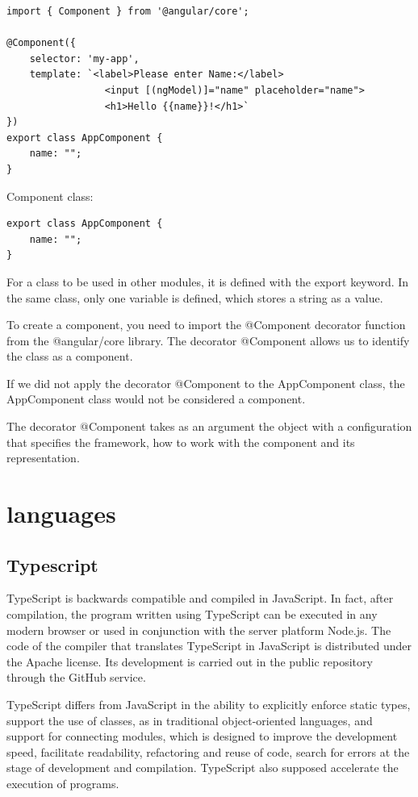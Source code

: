 \begin{verbatim}
import { Component } from '@angular/core';

@Component({
    selector: 'my-app',
    template: `<label>Please enter Name:</label>
                 <input [(ngModel)]="name" placeholder="name">
                 <h1>Hello {{name}}!</h1>`
})
export class AppComponent { 
    name: "";
}
\end{verbatim}

Component class:

\begin{verbatim}
export class AppComponent { 
    name: "";
}
\end{verbatim}

For a class to be used in other modules, it is defined with the export keyword. In the same class, only one variable is defined, which stores a string as a value.

To create a component, you need to import the @Component decorator function from the @angular/core library. The decorator @Component allows us to identify the class as a component.

If we did not apply the decorator @Component to the AppComponent class, the AppComponent class would not be considered a component.

The decorator @Component takes as an argument the object with a configuration that specifies the framework, how to work with the component and its representation. \cite{Angular}



\section{languages}

\subsection{Typescript}
TypeScript is backwards compatible and compiled in JavaScript. In fact, after compilation, the program written using TypeScript can be executed in any modern browser or used in conjunction with the server platform Node.js. The code of the compiler that translates TypeScript in JavaScript is distributed under the Apache license. Its development is carried out in the public repository through the GitHub service.\par
TypeScript differs from JavaScript in the ability to explicitly enforce static types, support the use of classes, as in traditional object-oriented languages, and support for connecting modules, which is designed to improve the development speed, facilitate readability, refactoring and reuse of code, search for errors at the stage of development and compilation. TypeScript also supposed accelerate the execution of programs. \cite{Typescript} \par

